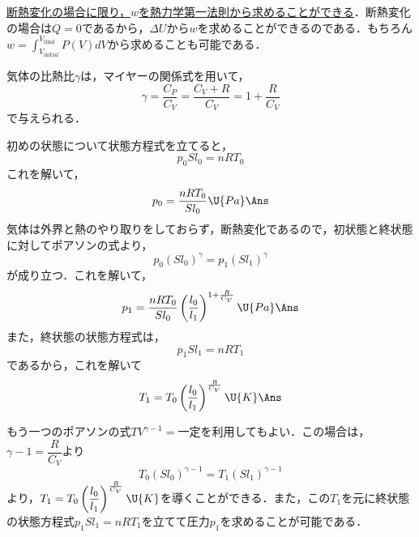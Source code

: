 \begin{multicols}{2}
\begin{sisin}
\underline{断熱変化の}\hskip0pt\underline{場合に限}\hskip0pt\underline{り，$w$を}\hskip0pt\underline{熱力学第}\hskip0pt\underline{一法則か}\hskip0pt\underline{ら求める}\hskip0pt\underline{ことがで}\hskip0pt\underline{きる}．断熱変化の場合は$Q=0$であるから，$\Delta U$から$w$を求めることができるのである．もちろん$w=\displaystyle\int_{V_{\mathrm{initial}}}^{V_{\mathrm{final}}}P(V)dV$から求めることも可能である．
\end{sisin}
\KaiHead
気体の比熱比$\gamma$は，マイヤーの関係式を用いて，
\[\gamma=\frac{C_P}{C_V}=\frac{C_V+R}{C_V}=1+\frac{R}{C_V}\]
で与えられる．
\begin{komon}
 初めの状態について状態方程式を立てると，
       \[p_0Sl_0=nRT_0\]
       これを解いて，
       \[p_0=\frac{nRT_0}{Sl_0}\U{Pa}\Ans\]
 気体は外界と熱のやり取りをしておらず，断熱変化であるので，初状態と終状態に対してポアソンの式より，
       \[p_0(Sl_0)^\gamma=p_1(Sl_1)^\gamma\]
       が成り立つ．これを解いて，
       \[p_1=\frac{nRT_0}{Sl_0}\left(\frac{l_0}{l_1}\right)^{1+\frac{R}{C_V}}\U{Pa}\Ans\]
       また，終状態の状態方程式は，
       \[p_1Sl_1=nRT_1\]
       であるから，これを解いて
       \[T_1=T_0\left(\frac{l_0}{l_1}\right)^{\frac{R}{C_V}}\U{K}\Ans\]
       \begin{bekkai}
       もう一つのポアソンの式$TV^{\gamma-1}=$一定を利用してもよい．この場合は，$\gamma-1=\dfrac{R}{C_V}$より
       \[T_0(Sl_0)^{\gamma-1}=T_1(Sl_1)^{\gamma-1}\]
       より，$T_1=T_0\left(\dfrac{l_0}{l_1}\right)^{\frac{R}{C_V}}\U{K}$を導くことができる．また，この$T_1$を元に終状態の状態方程式$p_1Sl_1=nRT_1$を立てて圧力$p_1$を求めることが可能である．


\end{bekkai}
\end{komon}
\end{multicols}
